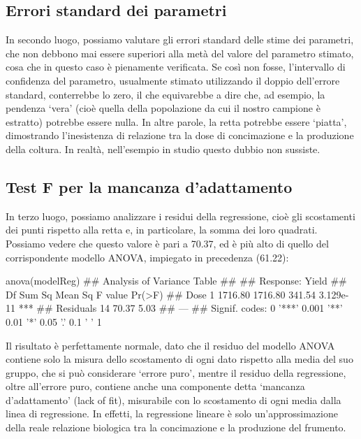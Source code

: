 \documentclass[a4paper,12pt,oneside]{book}
\newenvironment{Shaded}{}{}
\newcommand{\KeywordTok}[1]{#1}
\newcommand{\CommentTok}[1]{#1}
\newcommand{\NormalTok}[1]{#1}
\begin{document}
\hypertarget{errori-standard-dei-parametri}{%
\subsection{Errori standard dei parametri}\label{errori-standard-dei-parametri}}

In secondo luogo, possiamo valutare gli errori standard delle stime dei parametri, che non debbono mai essere superiori alla metà del valore del parametro stimato, cosa che in questo caso è pienamente verificata. Se così non fosse, l'intervallo di confidenza del parametro, usualmente stimato utilizzando il doppio dell'errore standard, conterrebbe lo zero, il che equivarebbe a dire che, ad esempio, la pendenza `vera' (cioè quella della popolazione da cui il nostro campione è estratto) potrebbe essere nulla. In altre parole, la retta potrebbe essere `piatta', dimostrando l'inesistenza di relazione tra la dose di concimazione e la produzione della coltura. In realtà, nell'esempio in studio questo dubbio non sussiste.

\hypertarget{test-f-per-la-mancanza-dadattamento}{%
\subsection{Test F per la mancanza d'adattamento}\label{test-f-per-la-mancanza-dadattamento}}

In terzo luogo, possiamo analizzare i residui della regressione, cioè gli scostamenti dei punti rispetto alla retta e, in particolare, la somma dei loro quadrati. Possiamo vedere che questo valore è pari a 70.37, ed è più alto di quello del corrispondente modello ANOVA, impiegato in precedenza (61.22):

\begin{Shaded}
\begin{Highlighting}[]
\KeywordTok{anova}\NormalTok{(modelReg)}
\CommentTok{## Analysis of Variance Table}
\CommentTok{## }
\CommentTok{## Response: Yield}
\CommentTok{##           Df  Sum Sq Mean Sq F value    Pr(>F)    }
\CommentTok{## Dose       1 1716.80 1716.80  341.54 3.129e-11 ***}
\CommentTok{## Residuals 14   70.37    5.03                      }
\CommentTok{## ---}
\CommentTok{## Signif. codes:  0 '***' 0.001 '**' 0.01 '*' 0.05 '.' 0.1 ' ' 1}
\end{Highlighting}
\end{Shaded}

Il risultato è perfettamente normale, dato che il residuo del modello ANOVA contiene solo la misura dello scostamento di ogni dato rispetto alla media del suo gruppo, che si può considerare `errore puro', mentre il residuo della regressione, oltre all'errore puro, contiene anche una componente detta `mancanza d'adattamento' (lack of fit), misurabile con lo scostamento di ogni media dalla linea di regressione. In effetti, la regressione lineare è solo un'approssimazione della reale relazione biologica tra la concimazione e la produzione del frumento.
\end{document}
